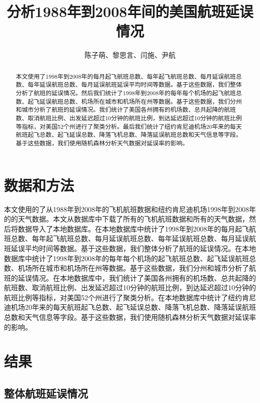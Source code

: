 \documentclass[12pt,a4paper,onecolumn]{article}
\title{\bfseries 分析1988年到2008年间的美国航班延误情况}
\date{}
\author{陈子萌、黎思言、闫施、尹航}
\begin{document}
\maketitle

\begin{abstract}
本文使用了1998年到2008年的每月起飞航班总数、每年起飞航班总数、每月延误航班总数、每年延误航班总数、每月延误航班延误平均时间等数据。基于这些数据，我们整体分析了航班的延误情况。然后我们统计了1998年到2008年的每年每个机场的起飞航班总数、起飞延误航班总数、机场所在城市和机场所在州等数据。基于这些数据，我们分州和城市分析了航班的延误情况。我们统计了美国各州拥有的机场数、总共起降的航班数、取消航班比例、出发延迟超过10分钟的航班比例，到达延迟超过10分钟的航班比例等指标，对美国52个州进行了聚类分析。最后我们统计了纽约肯尼迪机场20年来的每天航班起飞总数、起飞延误总数、降落飞机总数、降落延误航班总数和天气信息等字段。基于这些数据，我们使用随机森林分析天气数据对延误率的影响。
\end{abstract}

\section{数据和方法}

本文使用的了从1988年到2008年的飞机航班数据和纽约肯尼迪机场1998年到2008年的的天气数据。本文从数据库中下载了所有的飞机航班数据和所有的天气数据，然后将数据导入了本地数据库。在本地数据库中统计了1998年到2008年的每月起飞航班总数、每年起飞航班总数、每月延误航班总数、每年延误航班总数、每月延误航班延误平均时间等数据。基于这些数据，我们整体分析了航班的延误情况。在本地数据库中统计了1998年到2008年的每年每个机场的起飞航班总数、起飞延误航班总数、机场所在城市和机场所在州等数据。基于这些数据，我们分州和城市分析了航班的延误情况。在本地数据库中，我们统计了美国各州拥有的机场数、总共起降的航班数、取消航班比例、出发延迟超过10分钟的航班比例，到达延迟超过10分钟的航班比例等指标，对美国52个州进行了聚类分析。在本地数据库中统计了纽约肯尼迪机场20年来的每天航班起飞总数、起飞延误总数、降落飞机总数、降落延误航班总数和天气信息等字段。基于这些数据，我们使用随机森林分析天气数据对延误率的影响。

\section{结果}

\subsection{整体航班延误情况}
\end{document}
